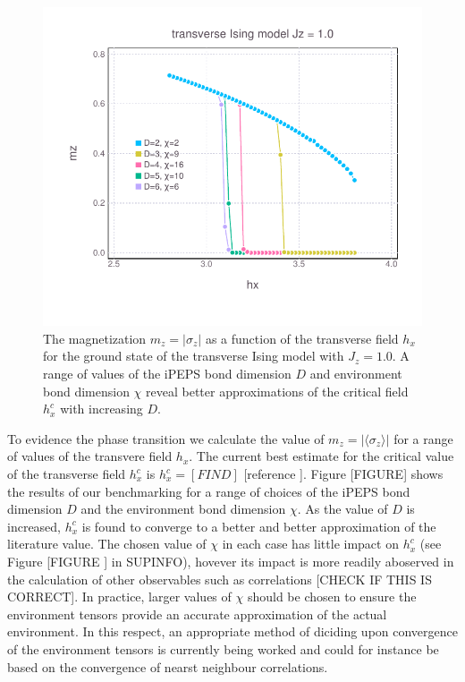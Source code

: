 \documentclass[10pt,twocolumn]{article}
\begin{document}
 \begin{figure}[h]
    \centering
    \includegraphics[width= \linewidth]{IsingBenchmarkingSmall.pdf}
    \caption{The magnetization $m_z= \lvert \sigma _z \rvert$ as a function of the transverse field $h_x$ for the ground state of the transverse Ising model with $J_z = 1.0$. A range of values of the iPEPS bond dimension $D$ and environment bond dimension $\chi$ reveal better approximations of the critical field $h_x^c$ with increasing $D$. }
    \label{fig:my_label}
\end{figure}

To evidence the phase transition we calculate the value of $m_z = \lvert \langle \sigma_z \rangle \rvert$ for a range of values of the transvere field $h_x$. The current best estimate for the critical value of the transverse field $h_x^c$ is $h_x^c = [FIND]$ [reference ]. Figure [FIGURE] shows the results of our benchmarking for a range of choices of the iPEPS bond dimension $D$ and the environment bond dimension $\chi$. As the value of $D$ is increased, $h_x^c$ is found to converge to a better and better approximation of the literature value. The chosen value of $\chi$ in each case has little impact on $h_x^c$ (see Figure [FIGURE ] in SUPINFO), hovever its impact is more readily aboserved in the calculation of other observables such as correlations [CHECK IF THIS IS CORRECT]. In practice, larger values of $\chi$ should be chosen to ensure the environment tensors provide an accurate approximation of the actual environment. In this respect, an appropriate method of diciding upon convergence of the environment tensors is currently being worked and could for instance be based on the convergence of nearst neighbour correlations. 
\end{document}
